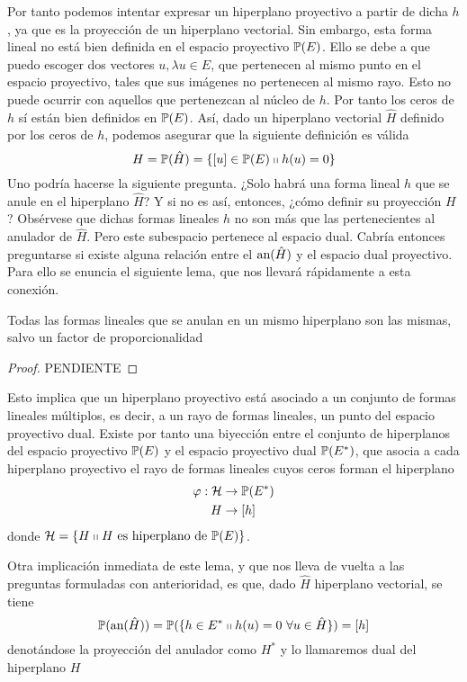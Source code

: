Por tanto podemos intentar expresar un hiperplano proyectivo a partir de dicha $h$, ya que es la proyección de un hiperplano vectorial. Sin embargo, esta forma lineal no está bien definida en el espacio proyectivo $\mathbb{P}(E)$. Ello se debe a que puedo escoger dos vectores  $u, \lambda u\in E$, que pertenecen al mismo punto en el espacio proyectivo, tales que sus imágenes no pertenecen al mismo rayo. Esto no puede ocurrir con aquellos que pertenezcan al núcleo de $h$. Por tanto los ceros de $h$ sí están bien definidos en $\mathbb{P}(E)$. Así, dado un hiperplano vectorial $\hat{H}$ definido por los ceros de $h$, podemos asegurar que la siguiente definición es válida
\begin{equation}
	H=\mathbb{P}(\hat{H})=\{[u]\in\mathbb{P}(E)\shortparallel h(u)=0\}
\end{equation}
Uno podría hacerse la siguiente pregunta. ¿Solo habrá una forma lineal $h$ que se anule en el hiperplano $\hat{H}$? Y si no es así, entonces, ¿cómo definir su proyección $H$? Obsérvese que dichas formas lineales $h$ no son más que las pertenecientes al anulador de $\hat{H}$. Pero este subespacio pertenece al espacio dual. Cabría entonces preguntarse si existe alguna relación entre el $\text{an}(\hat{H})$ y el espacio dual proyectivo. Para ello se enuncia el siguiente lema, que nos llevará rápidamente a esta conexión.
\begin{lem}
	\label{C1_lem_multiplosformaslienales}
	Todas las formas lineales que se anulan en un mismo hiperplano son las mismas, salvo un factor de proporcionalidad
\end{lem}
\begin{proof}
	PENDIENTE
\end{proof}
Esto implica que un hiperplano proyectivo está asociado a un conjunto de formas lineales múltiplos, es decir, a un rayo de formas lineales, un punto del espacio proyectivo dual. Existe por tanto una biyección entre el conjunto de hiperplanos del espacio proyectivo $\mathbb{P}(E)$ y el espacio proyectivo dual $\mathbb{P}(E^*)$, que asocia a cada hiperplano proyectivo el rayo de formas lineales cuyos ceros forman el hiperplano
\begin{equation}
	\begin{split}
		\varphi:\mathcal{H}& \rightarrow \mathbb{P}(E^*)\\
		H &\rightarrow [h]
	\end{split}
\end{equation}
donde $\mathcal{H}=\{H\shortparallel H \text{ es hiperplano de } \mathbb{P}(E)\}$.

Otra implicación inmediata de este lema, y que nos lleva de vuelta a las preguntas formuladas con anterioridad, es que, dado $\hat{H}$ hiperplano vectorial, se tiene
\begin{equation}
	\proy(\an{\hat{H}})=\proy(\{h\in E^*\tq h(u)=0\ \forall u\in \hat{H}\})=[h]
\end{equation}
denotándose la proyección del anulador como $H^*$ y lo llamaremos dual del hiperplano $H$

